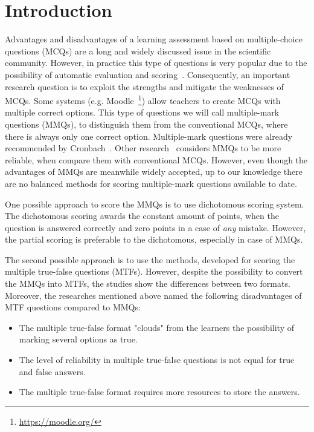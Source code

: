 \section{Introduction} 
\label{sec:intro}
Advantages and disadvantages of a learning assessment based on multiple-choice questions (MCQs) are a long and widely discussed issue in the scientific community.
However, in practice this type of questions is very popular due to the possibility of automatic evaluation and scoring~\cite{Farthing1998}.
Consequently, an important research question is to exploit the strengths and mitigate the weaknesses of MCQs.
Some systems (e.g. Moodle~\footnote{\url{https://moodle.org/}}) allow teachers to create MCQs with multiple correct options.
This type of questions we will call multiple-mark questions (MMQs), to distinguish them from the conventional MCQs, where there is always only one correct option.
Multiple-mark questions were already recommended by Cronbach~\cite{Cronbach}.
Other research~\cite{Ripkey1996,Pomplun1997,Hohensinn2011} considers MMQs to be more reliable, when compare them with conventional MCQs.
However, even though the advantages of MMQs are meanwhile widely accepted, up to our knowledge there are no balanced methods for scoring multiple-mark questions available to date.

One possible approach to score the MMQs is to use dichotomous scoring system. 
The dichotomous scoring awards the constant amount of points, when the question is answered correctly and zero points in a case of \textit{any} mistake.
However, the partial scoring is preferable to the dichotomous, especially in case of MMQs.~\cite{Ripkey1996,Jiao2012,Bauer2011,Ben-Simon1997} 

The second possible approach is to use the methods, developed for scoring the multiple true-false questions (MTFs).
However, despite the possibility to convert the MMQs into MTFs, the studies \cite{Cronbach,Dressel1953} show the differences between two formats.
Moreover, the researches mentioned above named the following disadvantages of MTF questions compared to MMQs:

\begin{itemize}
	\item The multiple true-false format "clouds" from the learners the possibility of marking several options as true.
	\item The level of reliability in multiple true-false questions is not equal for true and false answers.
	\item The multiple true-false format requires more resources to store the answers.
\end{itemize}

